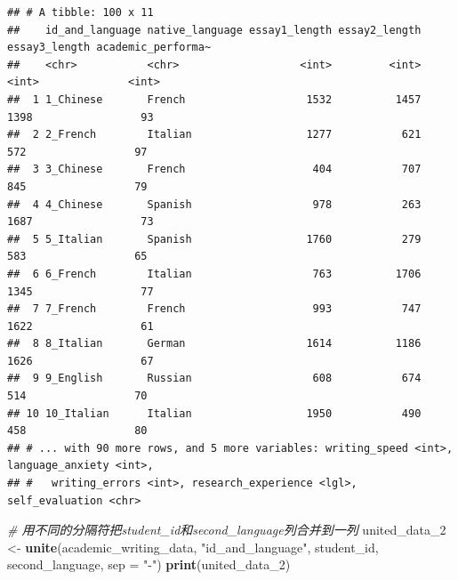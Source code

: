 \documentclass[]{book}
\newenvironment{Shaded}{\begin{snugshade}}{\end{snugshade}}
\newcommand{\CommentTok}[1]{\textcolor[rgb]{0.56,0.35,0.01}{\textit{#1}}}
\newcommand{\DataTypeTok}[1]{\textcolor[rgb]{0.13,0.29,0.53}{#1}}
\newcommand{\DecValTok}[1]{\textcolor[rgb]{0.00,0.00,0.81}{#1}}
\newcommand{\KeywordTok}[1]{\textcolor[rgb]{0.13,0.29,0.53}{\textbf{#1}}}
\newcommand{\NormalTok}[1]{#1}
\newcommand{\StringTok}[1]{\textcolor[rgb]{0.31,0.60,0.02}{#1}}
\begin{document}
\begin{verbatim}
## # A tibble: 100 x 11
##    id_and_language native_language essay1_length essay2_length essay3_length academic_performa~
##    <chr>           <chr>                   <int>         <int>         <int>              <int>
##  1 1_Chinese       French                   1532          1457          1398                 93
##  2 2_French        Italian                  1277           621           572                 97
##  3 3_Chinese       French                    404           707           845                 79
##  4 4_Chinese       Spanish                   978           263          1687                 73
##  5 5_Italian       Spanish                  1760           279           583                 65
##  6 6_French        Italian                   763          1706          1345                 77
##  7 7_French        French                    993           747          1622                 61
##  8 8_Italian       German                   1614          1186          1626                 67
##  9 9_English       Russian                   608           674           514                 70
## 10 10_Italian      Italian                  1950           490           458                 80
## # ... with 90 more rows, and 5 more variables: writing_speed <int>, language_anxiety <int>,
## #   writing_errors <int>, research_experience <lgl>, self_evaluation <chr>
\end{verbatim}

\begin{Shaded}
\begin{Highlighting}[]
\CommentTok{# 用不同的分隔符把student_id和second_language列合并到一列}
\NormalTok{united_data_}\DecValTok{2}\NormalTok{ <-}\StringTok{ }\KeywordTok{unite}\NormalTok{(academic_writing_data, }\StringTok{"id_and_language"}\NormalTok{, student_id, second_language, }\DataTypeTok{sep =} \StringTok{"-"}\NormalTok{)}
\KeywordTok{print}\NormalTok{(united_data_}\DecValTok{2}\NormalTok{)}
\end{Highlighting}
\end{Shaded}
\end{document}
